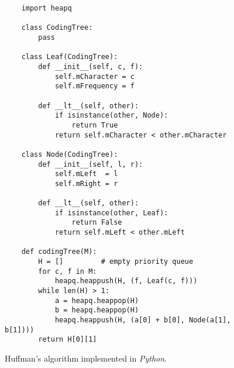 \begin{figure}[!ht]
\centering
\begin{verbatim}
    import heapq
                  
    class CodingTree:
        pass
    
    class Leaf(CodingTree):
        def __init__(self, c, f):
            self.mCharacter = c
            self.mFrequency = f
            
        def __lt__(self, other):
            if isinstance(other, Node):
                return True
            return self.mCharacter < other.mCharacter
                
    class Node(CodingTree):
        def __init__(self, l, r):
            self.mLeft  = l
            self.mRight = r
    
        def __lt__(self, other):
            if isinstance(other, Leaf):
                return False
            return self.mLeft < other.mLeft
                
    def codingTree(M):
        H = []         # empty priority queue
        for c, f in M:
            heapq.heappush(H, (f, Leaf(c, f)))
        while len(H) > 1:
            a = heapq.heappop(H)
            b = heapq.heappop(H)
            heapq.heappush(H, (a[0] + b[0], Node(a[1], b[1])))
        return H[0][1]
\end{verbatim}
\vspace*{-0.3cm}
\caption{Huffman's algorithm implemented in \textsl{Python}.}
\label{fig:Huffman.ipynb}
\end{figure} 

